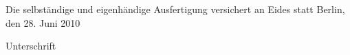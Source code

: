 \vspace*{\fill}

Die selbständige und eigenhändige Ausfertigung versichert an Eides statt \newline
Berlin, den 28. Juni 2010 \newline \newline
\hbox{} \dotfill \hspace{7.5cm} \hbox{} \newline
\hbox{} \begin{small}
Unterschrift
\end{small}
